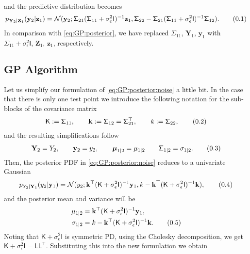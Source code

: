 \documentclass[10pt]{article}
\theoremstyle{definition}
\theoremstyle{definition}
\theoremstyle{remark}
\newcommand\eqnum{\addtocounter{equation}{1}\tag{\arabic{section}.\arabic{equation}}}
\begin{document}
and the predictive distribution becomes
\begin{equation*}
p_{\mathbf{Y}_2|\mathbf{Z}_1}(\mathbf{y}_2|\mathbf{z}_1) =
\mathcal{N}(\mathbf{y}_2; 
\mathsf{\Sigma}_{21}(\mathsf{\Sigma}_{11} + \sigma_{\epsilon}^2\mathsf{I})^{-1}\mathbf{z}_1, 
\mathsf{\Sigma}_{22} - \mathsf{\Sigma}_{21} (\mathsf{\Sigma}_{11}+\sigma_{\epsilon}^2\mathsf{I})^{-1} \mathsf{\Sigma}_{12}).
\eqnum
\label{eq:GP:posterior:noise}
\end{equation*}
In comparison with \cref{eq:GP:posterior}, we have replaced $\mathsf{\Sigma}_{11}$, $\mathbf{Y}_1$,  $\mathbf{y}_1$ with $\mathsf{\Sigma}_{11}+\sigma_{\epsilon}^2\mathsf{I}$,  $\mathbf{Z}_1$, $\mathbf{z}_1$, respectively.

\subsection{GP Algorithm}
Let us simplify our formulation of \cref{eq:GP:posterior:noise} a little bit. In the case that there is only one test point we introduce the following notation for the sub-blocks of the covariance matrix
\begin{equation*}
\mathsf{K}:=\mathsf{\Sigma}_{11} ,  \qquad
\mathbf{k}:=\mathsf{\Sigma}_{12}  =\mathsf{\Sigma}_{21}^{\top}, \qquad
k := \mathsf{\Sigma}_{22},
\eqnum
\end{equation*}
and the resulting simplifications follow
\begin{equation*}
\mathbf{Y}_2 = Y_2, \qquad
\mathbf{y}_2 = y_2, \qquad
\boldsymbol{\mu}_{1|2} = \mu_{1|2} \qquad
\mathsf{\Sigma}_{1|2} = \sigma_{1|2}.
\eqnum
\end{equation*}
Then, the posterior PDF in \cref{eq:GP:posterior:noise} reduces to a univariate Gaussian
\begin{equation*}
p_{Y_2|\mathbf{Y}_1}(y_2|\mathbf{y}_1) = 
\mathcal{N}(y_2; \mathbf{k}^{\top}(\mathsf{K} + \sigma_{\epsilon}^2\mathsf{I})^{-1}\mathbf{y}_1, k - 
\mathbf{k}^{\top} (\mathsf{K}+\sigma_{\epsilon}^2\mathsf{I})^{-1} \mathbf{k}),
\eqnum
\label{eq:GP:posterior:single}
\end{equation*}
and the posterior mean and variance will be
\begin{align*}
\mu_{1|2}  &= \mathbf{k}^{\top}(\mathsf{K}+\sigma_{\epsilon}^2\mathsf{I})^{-1}\mathbf{y}_1, \\
\sigma_{1|2} &= k - \mathbf{k}^{\top} (\mathsf{K}+\sigma_{\epsilon}^2\mathsf{I})^{-1} \mathbf{k}.
\eqnum
\end{align*}
Noting that $\mathsf{K}+\sigma_{\epsilon}^2\mathsf{I}$ is symmetric PD, using the Cholesky decomposition, we get $\mathsf{K}+\sigma_{\epsilon}^2\mathsf{I}=\mathsf{L}\mathsf{L}^{\top}$. Substituting this into the new formulation we obtain
\end{document}
